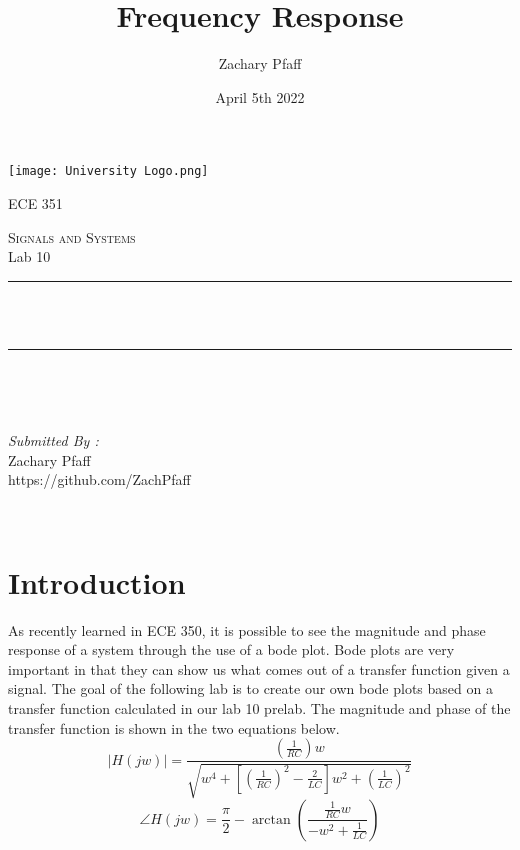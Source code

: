 \documentclass[12pt]{report}
\title{Frequency Response}
\author{Zachary Pfaff}
\date{April 5th 2022}
\makeatletter
\let\thetitle\@title
\makeatother
\begin{document}
\begin{titlepage}
\centering
\vspace*{0.5 cm}
\texttt{[image: University Logo.png]}\\
\begin{center}    \textsc{\Large   ECE 351}\\[2.0 cm]
\end{center}%
\textsc{\Large Signals and Systems  }\\[0.5 cm] %
Lab 10
\rule{\linewidth}{0.2 mm} \\[0.4 cm]
{ \huge \bfseries \thetitle}\\
\rule{\linewidth}{0.2 mm} \\[1.5 cm]
\begin{minipage}{0.4\textwidth}
\begin{flushleft} \large
\end{flushleft}
\end{minipage}~
\begin{minipage}{0.4\textwidth}
\begin{flushright} \large
\emph{Submitted By :} \\
Zachary Pfaff\\https://github.com/ZachPfaff
\end{flushright}
\end{minipage}\\[2 cm]
\end{titlepage}
\tableofcontents
\pagebreak
\renewcommand{\thesection}{\arabic{section}}
\setlength{\parindent}{20pt}

\maketitle
\section{Introduction}
\hspace{\parindent}As recently learned in ECE 350, it is possible to see the magnitude and phase response of a system through the use of a bode plot. Bode plots are very important in that they can show us what comes out of a transfer function given a signal. The goal of the following lab is to create our own bode plots based on a transfer function calculated in our lab 10 prelab. The magnitude and phase of the transfer function is shown in the two equations below.
\[|H(jw)| = \frac{(\frac{1}{RC})w}{\sqrt{w^4+[(\frac{1}{RC})^2-\frac{2}{LC}]w^2+(\frac{1}{LC})^2}}\]
\[\angle H(jw) = \frac{\pi}{2}-\arctan(\frac{\frac{1}{RC}w}{-w^2+\frac{1}{LC}})\]
\end{document}
